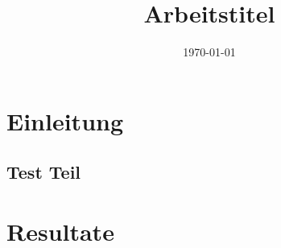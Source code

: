 \documentclass[a4paper, 11pt, oneside]{thesis/HSR}  %
\begin{document}
  \title  {Arbeitstitel}
  \addresses  {\groupname\\\deptname\\\univname}  %
  \date       {\today}
  \subject    {}
  \keywords   {}

  \maketitle


  \pagestyle{fancy}  %

  \tableofcontentspage

  \mainmatter    %
  \pagestyle{fancy}  %









  \chapter{Einleitung}
  \blindtext

  \section{Test Teil}\label{test section}
  \Blindtext
  \Blindtext
  \Blindtext

  \chapter{Resultate}\label{results}
  \Blindtext
\end{document}
